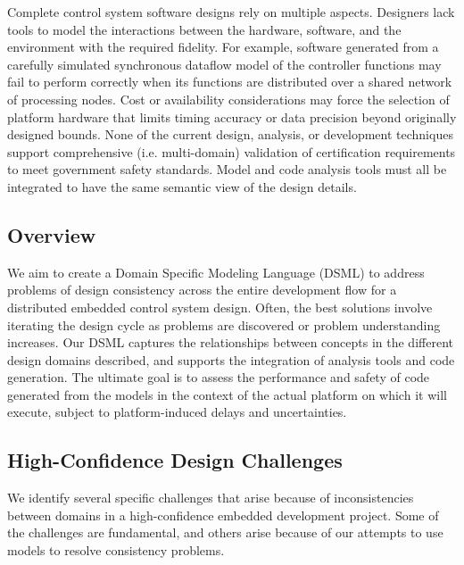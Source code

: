 Complete control system software designs rely on multiple aspects.  
Designers lack tools to model the interactions 
between the hardware, software, and the environment 
with the required fidelity.  For example, software 
generated from a carefully simulated synchronous 
dataflow model of the controller functions 
may fail to perform correctly when 
its functions are distributed over a shared network of 
processing nodes.  Cost or availability considerations may force the
selection of platform hardware that limits timing accuracy 
or data precision beyond originally designed bounds.  
None of the current design, analysis,
or development techniques support comprehensive 
(i.e. multi-domain) validation of certification 
requirements to meet government safety standards. 
Model and code analysis tools must all be integrated to
have the same semantic view of the design details.

\subsection{Overview}

We aim to create a Domain Specific Modeling Language (DSML)
to address problems of design consistency across the entire 
development flow for a distributed embedded control system 
design.  Often, the best solutions involve iterating the 
design cycle as problems are discovered or problem understanding
increases.  Our DSML captures the relationships between 
concepts in the different design domains described, and supports
the integration of analysis tools and code generation.  The ultimate goal is to 
assess the performance and safety of code generated from the models in the context of the actual platform on which it will execute, subject to platform-induced delays and uncertainties.

\subsection*{High-Confidence Design Challenges}

We identify several specific challenges that arise because of 
inconsistencies between domains in a high-confidence embedded 
development project.  Some of the challenges are fundamental,
and others arise because of our attempts to use models to
resolve consistency problems.

